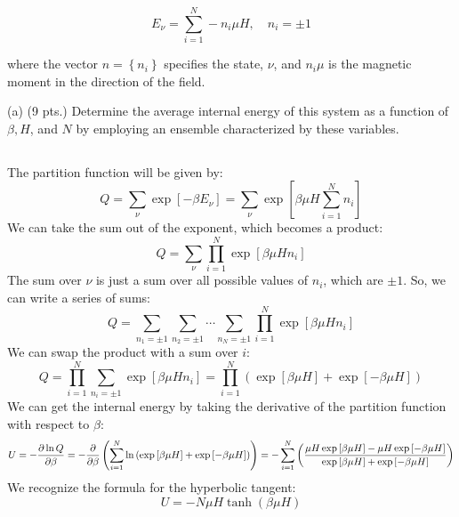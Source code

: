 \documentclass[10pt]{article}
\begin{document}
$$
E_{\nu}=\sum_{i=1}^{N}-n_{i} \mu H, \quad n_{i}= \pm 1
$$

where the vector $n=\left\{n_{i}\right\}$ specifies the state, $\nu$, and $n_{i} \mu$ is the magnetic moment in the direction of the field.

(a) (9 pts.) Determine the average internal energy of this system as a function of $\beta, H$, and $N$ by employing an ensemble characterized by these variables.
\subsection{}
The partition function will be given by:
\begin{equation}
  Q = \sum_{\nu} \exp \left[ - \beta E_{\nu} \right] = \sum_{\nu} \exp \left[ \beta \mu H \sum_{i=1}^{N} n_{i} \right]
\end{equation}
We can take the sum out of the exponent, which becomes a product:
\begin{equation}
  Q = \sum_{\nu} \prod_{i=1}^{N} \exp \left[ \beta \mu H n_{i} \right]
\end{equation}
The sum over $\nu$ is just a sum over all possible values of $n_{i}$, which are $\pm 1$. So, we can write a series of sums:
\begin{equation}
  Q = \sum_{n_{1} = \pm 1} \sum_{n_{2} = \pm 1} \cdots \sum_{n_{N} = \pm 1} \prod_{i=1}^{N} \exp \left[ \beta \mu H n_{i} \right]
\end{equation}
We can swap the product with a sum over $i$:
\begin{equation}
  Q = \prod_{i=1}^{N}\sum_{n_{i} = \pm 1} \exp \left[ \beta \mu H n_{i} \right] = \prod_{i = 1}^{N} \left( \exp \left[ \beta \mu H \right] + \exp \left[ - \beta \mu H \right] \right)
\end{equation}
We can get the internal energy by taking the derivative of the partition function with respect to $\beta$:
\begin{equation}
  U = - \pdv{\ln Q}{\beta} = - \pdv{\beta} \left( \sum_{i = 1}^{N} \ln \left( \exp \left[ \beta \mu H \right] + \exp \left[ - \beta \mu H \right] \right) \right) = - \sum_{i = 1}^{N}\left( \frac{\mu H \exp \left[ \beta \mu H \right] - \mu H \exp \left[ - \beta \mu H \right]}{\exp \left[ \beta \mu H \right] + \exp \left[ - \beta \mu H \right]} \right)
\end{equation}
We recognize the formula for the hyperbolic tangent:
\begin{equation}
  U = - N \mu H \tanh \left( \beta \mu H \right)
\end{equation}
\end{document}
